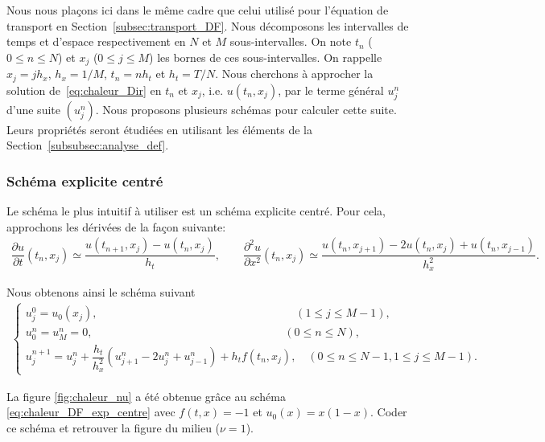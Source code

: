\documentclass[12pt,a4paper,twoside]{article}
\begin{document}
Nous nous pla\c{c}ons ici dans le m\^eme cadre que celui utilis\'e pour 
l'\'equation de transport en Section~\ref{subsec:transport_DF}.
Nous d\'ecomposons les intervalles de temps et d'espace
respectivement en $N$ et $M$ sous-intervalles.
On note $t_n$ ($0 \leq n \leq N$) et $x_j$ ($0 \leq j \leq M$)
les bornes de ces sous-intervalles.
On rappelle $x_j = j h_x$, $h_x = 1/M$, $t_n = n h_t$ et $h_t = T / N$.
Nous cherchons \`a approcher la solution de~\eqref{eq:chaleur_Dir}
en $t_n$ et $x_j$, i.e. $u(t_n,x_j)$, par le terme g\'en\'eral $u_j^n$ d'une suite
$(u_j^n)$. 
Nous proposons plusieurs sch\'emas pour calculer cette suite.
Leurs propri\'et\'es seront \'etudi\'ees en utilisant les 
\'el\'ements de la Section~\ref{subsubsec:analyse_def}.

\subsubsection{Sch\'ema explicite centr\'e}

Le sch\'ema le plus intuitif \`a utiliser est un sch\'ema 
explicite centr\'e.
Pour cela, approchons les d\'eriv\'ees de la fa\c{c}on suivante:
\begin{align*}
  \dfrac{\partial u}{\partial t}(t_n,x_j) \simeq \dfrac{u(t_{n+1},x_j) - u(t_n,x_j)}{h_t} ,
  \qquad 
  \dfrac{\partial^2 u}{\partial x^2}(t_n,x_j) 
  \simeq \dfrac{u(t_{n},x_{j+1}) - 2 u(t_n,x_j) + u(t_n,x_{j-1})}{h_x^2} .
\end{align*}


Nous obtenons ainsi le sch\'ema suivant
\begin{align}
  \label{eq:chaleur_DF_exp_centre}
  \left\{
  \begin{array}{l}
    u_j^0
    = u_0(x_j) ,
    \qquad \qquad \qquad \qquad \qquad \qquad \qquad \qquad \;\;\quad
    (1 \leq j \leq M-1) , 
    \\
    u_0^n = u_M^n = 0 ,
    \qquad \qquad \qquad \qquad \qquad \qquad \qquad \qquad \quad
    (0 \leq n \leq N), 
    \\
    u_j^{n+1}
    = u_j^{n} + \dfrac{h_t}{h_x^2} (u_{j+1}^{n} - 2 u_{j}^{n} + u_{j-1}^{n} ) 
    + h_t f(t_n,x_j) ,
    \quad (0 \leq n \leq N-1, 1 \leq j \leq M-1).
  \end{array}
  \right.
\end{align}

\begin{exercise}
  La figure \ref{fig:chaleur_nu} 
  a \'et\'e obtenue gr\^ace au sch\'ema \eqref{eq:chaleur_DF_exp_centre}
  avec $f(t,x) = -1$ et $u_0(x) = x(1-x)$.
  Coder ce sch\'ema et retrouver la figure du milieu ($\nu = 1$).
\end{exercise}
\end{document}
